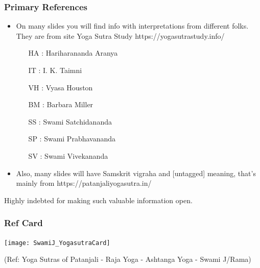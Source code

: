 \begin{frame}[fragile]\frametitle{Primary References}
	\begin{itemize}
	\item On many slides you will find info with interpretations from different folks. They are from  site Yoga Sutra Study https://yogasutrastudy.info/
		\begin{itemize}
		\item [HA]: Hariharananda Aranya
		\item [IT]: I. K. Taimni
		\item [VH]: Vyasa Houston
		\item [BM]: Barbara Miller
		\item [SS]: Swami Satchidananda
		\item [SP]: Swami Prabhavananda
		\item [SV]: Swami Vivekananda
		\end{itemize}	
	\item Also, many slides will have Samskrit vigraha and [untagged] meaning, that's mainly from https://patanjaliyogasutra.in/
	\end{itemize}

Highly indebted for making such valuable information open.

\end{frame}

\begin{frame}[fragile]\frametitle{Ref Card}

\begin{center}
\texttt{[image: SwamiJ\_YogasutraCard]}

\end{center}

  
  \tiny{(Ref: Yoga Sutras of Patanjali - Raja Yoga - Ashtanga Yoga - Swami J/Rama)}

\end{frame}


